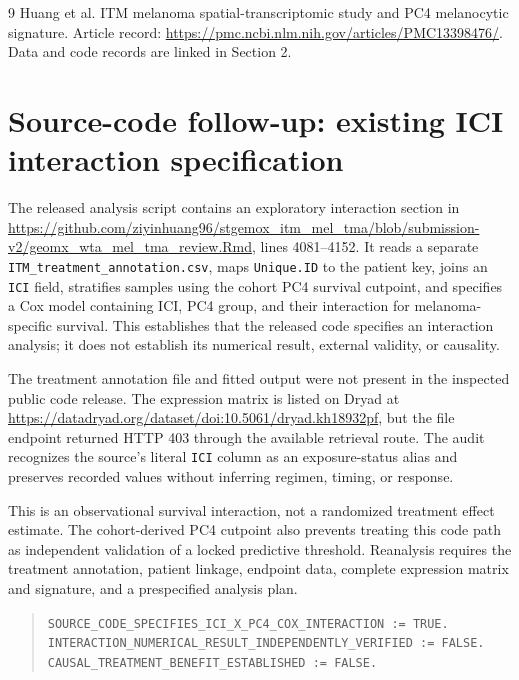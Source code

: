 \documentclass[11pt]{article}
\begin{document}
\begin{thebibliography}{9}
Huang et al.
\newblock ITM melanoma spatial-transcriptomic study and PC4 melanocytic signature.
\newblock Article record: \url{https://pmc.ncbi.nlm.nih.gov/articles/PMC13398476/}.
\newblock Data and code records are linked in Section 2.
\end{thebibliography}

\section{Source-code follow-up: existing ICI interaction specification}

The released analysis script contains an exploratory interaction section in
\url{https://github.com/ziyinhuang96/stgemox_itm_mel_tma/blob/submission-v2/geomx_wta_mel_tma_review.Rmd},
lines 4081--4152. It reads a separate
\texttt{ITM\_treatment\_annotation.csv}, maps \texttt{Unique.ID} to the patient
key, joins an \texttt{ICI} field, stratifies samples using the cohort PC4
survival cutpoint, and specifies a Cox model containing ICI, PC4 group, and
their interaction for melanoma-specific survival. This establishes that the
released code specifies an interaction analysis; it does not establish its
numerical result, external validity, or causality.

The treatment annotation file and fitted output were not present in the
inspected public code release. The expression matrix is listed on Dryad at
\url{https://datadryad.org/dataset/doi:10.5061/dryad.kh18932pf}, but the file
endpoint returned HTTP 403 through the available retrieval route. The audit
recognizes the source's literal \texttt{ICI} column as an exposure-status
alias and preserves recorded values without inferring regimen, timing, or
response.

This is an observational survival interaction, not a randomized treatment
effect estimate. The cohort-derived PC4 cutpoint also prevents treating this
code path as independent validation of a locked predictive threshold.
Reanalysis requires the treatment annotation, patient linkage, endpoint data,
complete expression matrix and signature, and a prespecified analysis plan.

\begin{quote}
\texttt{SOURCE\_CODE\_SPECIFIES\_ICI\_X\_PC4\_COX\_INTERACTION := TRUE.}\\
\texttt{INTERACTION\_NUMERICAL\_RESULT\_INDEPENDENTLY\_VERIFIED := FALSE.}\\
\texttt{CAUSAL\_TREATMENT\_BENEFIT\_ESTABLISHED := FALSE.}
\end{quote}
\end{document}
